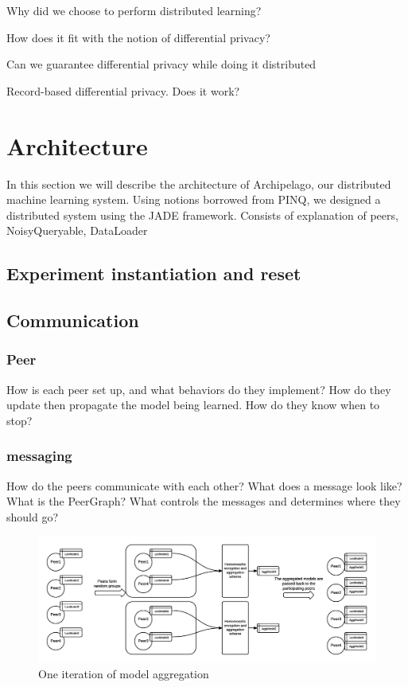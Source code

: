 Why did we choose to perform distributed learning?

How does it fit with the notion of differential privacy?

Can we guarantee differential privacy while doing it distributed

Record-based differential privacy. Does it work?




\section{Architecture}

In this section we will describe the architecture of Archipelago, our distributed machine learning system. 
Using notions borrowed from PINQ, we designed a distributed system using the JADE framework. Consists of explanation of peers, NoisyQueryable, DataLoader


\subsection{Experiment instantiation and reset}


\subsection{Communication}
\subsubsection{Peer}
How is each peer set up, and what behaviors do they implement? 
How do they update then propagate the model being learned.
How do they know when to stop?
\subsubsection{messaging}
How do the peers communicate with each other?
What does a message look like?
What is the PeerGraph?
What controls the messages and determines where they should go?
\begin{figure}[h!]
	\centering
	\includegraphics[width=\textwidth]{fig/peerModelCreation}
	\caption{One iteration of model aggregation}
	\label{fig:peerAggregationFigure}
\end{figure}


